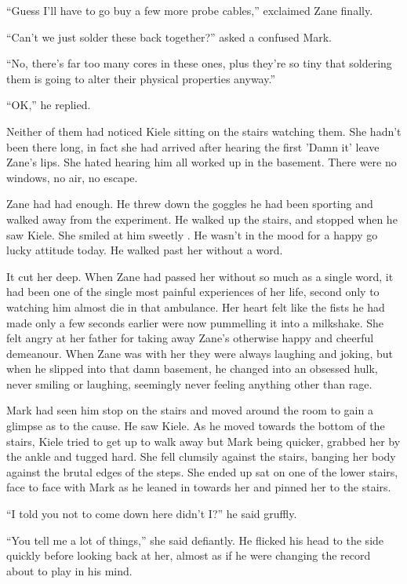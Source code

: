 ``Guess I'll have to go buy a few more probe cables,'' exclaimed Zane finally.

``Can't we just solder these back together?'' asked a confused Mark.

``No, there's far too many cores in these ones, plus they're so tiny that soldering them is going to alter their physical properties anyway.''

``OK,'' he replied.

Neither of them had noticed Kiele sitting on the stairs watching them.  She hadn't been there long, in fact she had arrived after hearing the first 'Damn it' leave Zane's lips.  She hated hearing him all worked up in the basement.  There were no windows, no air, no escape.  

Zane had had enough.  He threw down the goggles he had been sporting and walked away from the experiment.  He walked up the stairs, and stopped when he saw Kiele.  She smiled at him sweetly .  He wasn't in the mood for a happy go lucky attitude today.  He walked past her without a word.

It cut her deep.  When Zane had passed her without so much as a single word, it had been one of the single most painful experiences of her life, second only to watching him almost die in that ambulance.  Her heart felt like the fists he had made only a few seconds earlier were now pummelling it into a milkshake.  She felt angry at her father for taking away Zane's otherwise happy and cheerful demeanour.  When Zane was with her they were always laughing and joking, but when he slipped into that damn basement, he changed into an obsessed hulk, never smiling or laughing, seemingly never feeling anything other than rage.

Mark had seen him stop on the stairs and moved around the room to gain a glimpse as to the cause.  He saw Kiele.  As he moved towards the bottom of the stairs, Kiele tried to get up to walk away but Mark being quicker, grabbed her by the ankle and tugged hard.  She fell clumsily against the stairs, banging her body against the brutal edges of the steps.  She ended up sat on one of the lower stairs, face to face with Mark as he leaned in towards her and pinned her to the stairs.

``I told you not to come down here didn't I?'' he said gruffly.

``You tell me a lot of things,'' she said defiantly.  He flicked his head to the side quickly before looking back at her, almost as if he were changing the record about to play in his mind.

